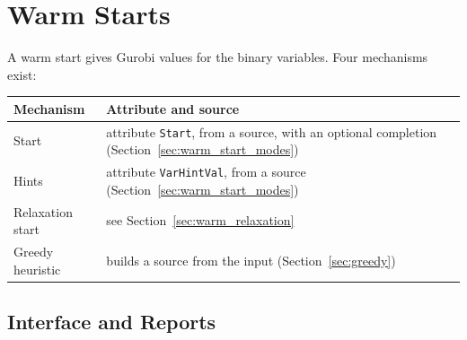 \documentclass[11pt,a4paper]{article}
\makeatletter
\theoremstyle{plain}
\theoremstyle{definition}
\renewcommand{\_}{\textunderscore\allowbreak{}}
\providecommand{\rejrow}[2]{{\raggedright #1\par} & {\raggedright #2\par} \\}
\providecommand{\tabstart}[2]{\begingroup\small\begin{longtable}{@{}#1@{}}\toprule #2 \\ \midrule \endhead}
\providecommand{\tabend}{\bottomrule\end{longtable}\endgroup}
\makeatother
\begin{document}
\section{Warm Starts}
\label{sec:warm_starts}

A warm start gives Gurobi values for the binary variables. Four mechanisms exist:

\tabstart{p{3.4cm}p{11.6cm}}{Mechanism & Attribute and source}
\rejrow{Start}{attribute \texttt{Start}, from a source, with an optional completion (Section~\ref{sec:warm_start_modes})}
\rejrow{Hints}{attribute \texttt{VarHintVal}, from a source (Section~\ref{sec:warm_start_modes})}
\rejrow{Relaxation start}{see Section~\ref{sec:warm_relaxation}}
\rejrow{Greedy heuristic}{builds a source from the input (Section~\ref{sec:greedy})}
\tabend

\subsection{Interface and Reports}
\label{sec:warm_interface}
\label{sec:warm_reports}
\end{document}
